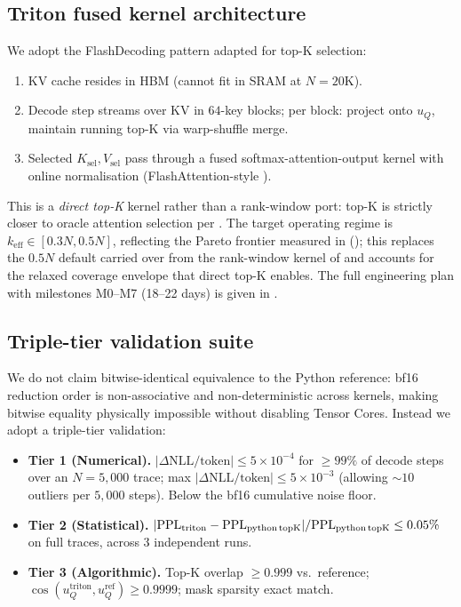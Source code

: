 \documentclass[11pt]{article}
\theoremstyle{definition}
\theoremstyle{remark}
\theoremstyle{plain}
\begin{document}
\subsection{Triton fused kernel architecture}\label{sec:kernel}

We adopt the FlashDecoding pattern \citep{dao2023flashdecoding} adapted for top-K
selection:

\begin{enumerate}\setlength\itemsep{1pt}
  \item KV cache resides in HBM (cannot fit in SRAM at $N\!=\!20\text{K}$).
  \item Decode step streams over KV in $64$-key blocks; per block: project onto
    $u_Q$, maintain running top-K via warp-shuffle merge.
  \item Selected $K_{\text{sel}},V_{\text{sel}}$ pass through a fused
    softmax-attention-output kernel with online normalisation
    (FlashAttention-style \citep{dao2022flashattention}).
\end{enumerate}

This is a \emph{direct top-K} kernel rather than a rank-window port: top-K is
strictly closer to oracle attention selection per . The
target operating regime is $k_\text{eff}\in[0.3N, 0.5N]$, reflecting the
Pareto frontier measured in  (); this
replaces the $0.5N$ default carried over from the rank-window kernel of
\citet{seqev2025qaxis} and accounts for the relaxed coverage envelope that
direct top-K enables. The full engineering plan with milestones M0--M7
(18--22 days) is given in .

\subsection{Triple-tier validation suite}

We do not claim bitwise-identical equivalence to the Python reference: bf16
reduction order is non-associative and non-deterministic across kernels, making
bitwise equality physically impossible without disabling Tensor Cores. Instead
we adopt a triple-tier validation:

\begin{itemize}\setlength\itemsep{1pt}
  \item \textbf{Tier 1 (Numerical).}
    $|\Delta\mathrm{NLL}/\text{token}|\leq 5\!\times\!10^{-4}$ for $\geq\!99\%$ of
    decode steps over an $N\!=\!5{,}000$ trace; max
    $|\Delta\mathrm{NLL}/\text{token}|\leq 5\!\times\!10^{-3}$ (allowing $\sim\!10$
    outliers per $5{,}000$ steps). Below the bf16 cumulative noise floor.
  \item \textbf{Tier 2 (Statistical).}
    $|\mathrm{PPL}_\text{triton}-\mathrm{PPL}_\text{python\,topK}|/
    \mathrm{PPL}_\text{python\,topK}\leq 0.05\%$ on full traces, across
    $3$ independent runs.
  \item \textbf{Tier 3 (Algorithmic).}
    Top-K overlap $\geq 0.999$ vs.\ reference;
    $\cos(u_Q^\text{triton},u_Q^\text{ref})\geq 0.9999$;
    mask sparsity exact match.
\end{itemize}
\end{document}
